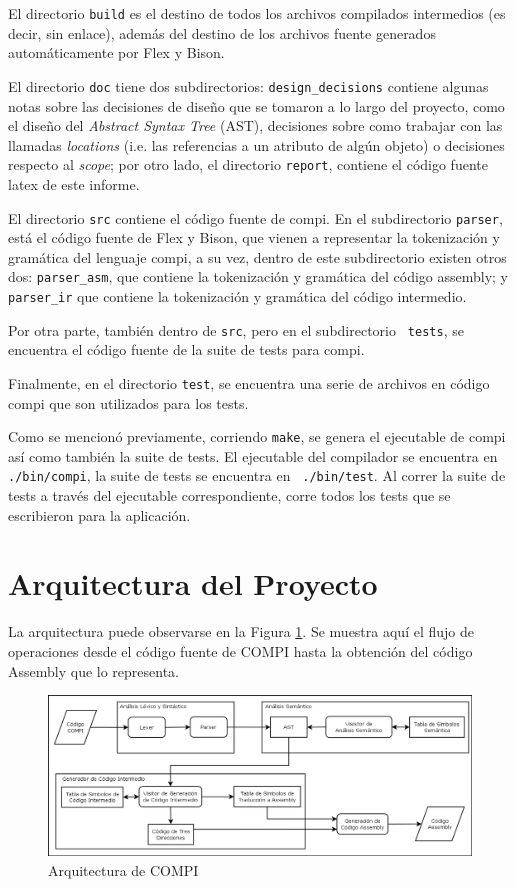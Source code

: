 \documentclass[12pt, a4paper, titlepage]{article}
\begin{document}
  El directorio {\tt build} es el destino de todos los archivos compilados
  intermedios (es decir, sin enlace), además del destino de los archivos fuente
  generados automáticamente por Flex y Bison.

  El directorio {\tt doc} tiene dos subdirectorios: {\tt design\_decisions}
  contiene algunas notas sobre las decisiones de diseño que se tomaron a lo
  largo del proyecto, como el diseño del {\em Abstract Syntax Tree} (AST),
  decisiones sobre como trabajar con las llamadas {\em locations} (i.e. las
  referencias a un atributo de algún objeto) o decisiones respecto al {\em
  scope}; por otro lado, el directorio {\tt report}, contiene el código fuente
  latex de este informe.

  El directorio {\tt src} contiene el código fuente de {\sc compi}. En el
  subdirectorio {\tt parser}, está el código fuente de Flex y Bison, que vienen
  a representar la tokenización y gramática del lenguaje compi, a su vez, dentro
  de este subdirectorio existen otros dos: {\tt parser\_asm}, que contiene la
  tokenización y gramática del código assembly; y {\tt parser\_ir} que contiene
  la tokenización y gramática del código intermedio.

  Por otra parte, también dentro de {\tt src}, pero en el subdirectorio {\tt
  tests}, se encuentra el código fuente de la suite de tests para {\sc compi}.

  Finalmente, en el directorio {\tt test}, se encuentra una serie de archivos en
  código {\sc compi} que son utilizados para los tests.

  Como se mencionó previamente, corriendo {\tt make}, se genera el ejecutable de
  {\sc compi} así como también la suite de tests. El ejecutable del compilador
  se encuentra en {\tt ./bin/compi}, la suite de tests se encuentra en {\tt
  ./bin/test}. Al correr la suite de tests a través del ejecutable
  correspondiente, corre todos los tests que se escribieron para la aplicación.

  \section{Arquitectura del Proyecto}\label{sec:architecture}

  La arquitectura puede observarse en la Figura \ref{fig:architecture}. Se
  muestra aquí el flujo de operaciones desde el código fuente de COMPI hasta la
  obtención del código Assembly que lo representa.

  \begin{figure}[h]
    \centering
    \includegraphics[width=\textwidth]{architecture.png}
    \caption{Arquitectura de COMPI}
    \label{fig:architecture}
  \end{figure}
\end{document}
